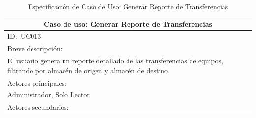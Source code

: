 \documentclass[stu, 12pt, letterpaper, donotrepeattitle, floatsintext, natbib]{apa7}
\begin{document}
\begin{longtable}{@{} p{16.5cm} @{}}
    \caption{Especificación de Caso de Uso: Generar Reporte de Transferencias}\label{tab:UC013}                                                                                                                                                                                       \\ \toprule
    \multicolumn{1}{c}{Caso de uso: Generar Reporte de Transferencias}                                                                                                                                                                                                                \\ \midrule
    ID:~UC013                                                                                                                                                                                                                                                                         \\ \midrule
    Breve descripción:                                                                                                                                                                                                                                                                \\
    El usuario genera un reporte detallado de las transferencias de equipos, filtrando por almacén de origen y almacén de destino.                                                                                                                                                    \\ \midrule
    Actores principales:                                                                                                                                                                                                                                                              \\
    Administrador, Solo Lector                                                                                                                                                                                                                                                        \\ \midrule
    Actores secundarios:                                                                                                                                                                                                                                                              \\

\end{longtable}
\end{document}
